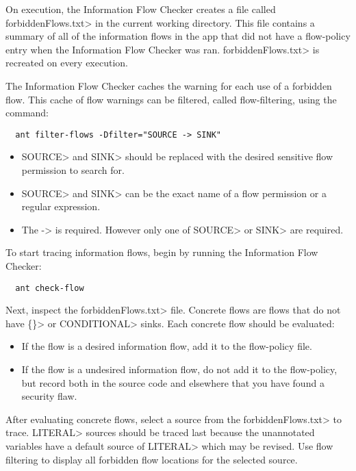 On execution, the Information Flow Checker creates a file called \<forbiddenFlows.txt> in the current
working directory. This file contains a summary of all of the information flows
in the app that did not have a flow-policy entry when the Information Flow Checker was ran.
\<forbiddenFlows.txt> is recreated on every execution.

The Information Flow Checker caches the warning for each use of a forbidden flow.
This cache of flow warnings can be filtered, called flow-filtering, using the command:

\begin{Verbatim}
  ant filter-flows -Dfilter="SOURCE -> SINK"
\end{Verbatim}

\begin{itemize}

\item \<SOURCE> and \<SINK> should be replaced with the desired sensitive flow
permission to search for.

\item \<SOURCE> and \<SINK> can be the exact name of a flow permission or a regular
expression.

\item The -> is required. However only one of \<SOURCE> or \<SINK> are required.
\end{itemize}

To start tracing information flows, begin by running the Information Flow Checker:

\begin{Verbatim}
  ant check-flow
\end{Verbatim}

Next, inspect the \<forbiddenFlows.txt> file. Concrete flows are flows that do not have
\<\{\}> or \<CONDITIONAL> sinks. Each concrete flow should be evaluated:

\begin{itemize}
\item
If the flow is a desired information flow, add it to the flow-policy file.
\item
If the flow is a undesired information flow, do not add it to the flow-policy,
but record both in the source code and elsewhere that you have found a security flaw.
\end{itemize}

After evaluating concrete flows, select a source from the \<forbiddenFlows.txt> to trace.
\<LITERAL> sources should be traced last because the unannotated variables have
a default source of \<LITERAL> which may be revised. Use flow filtering to display
all forbidden flow locations for the selected source.

